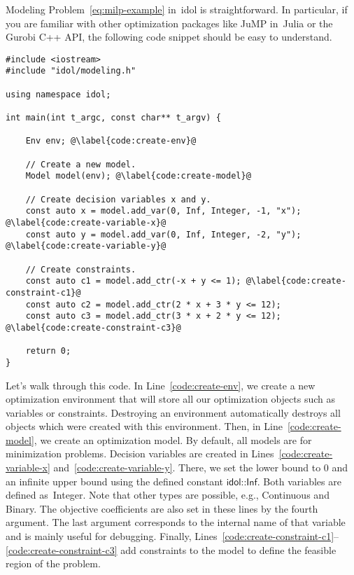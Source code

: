 Modeling Problem~\eqref{eq:milp-example} in~\textsf{idol} is straightforward.
In particular, if you are familiar with other optimization packages like
\textsf{JuMP} in~\textsf{Julia} or the \textsf{Gurobi} \textsf{C++} API,
the following code snippet should be easy to understand.
%
\begin{lstlisting}
#include <iostream>
#include "idol/modeling.h"

using namespace idol;

int main(int t_argc, const char** t_argv) {

    Env env; @\label{code:create-env}@

    // Create a new model.
    Model model(env); @\label{code:create-model}@

    // Create decision variables x and y.
    const auto x = model.add_var(0, Inf, Integer, -1, "x"); @\label{code:create-variable-x}@
    const auto y = model.add_var(0, Inf, Integer, -2, "y"); @\label{code:create-variable-y}@

    // Create constraints.
    const auto c1 = model.add_ctr(-x + y <= 1); @\label{code:create-constraint-c1}@
    const auto c2 = model.add_ctr(2 * x + 3 * y <= 12);
    const auto c3 = model.add_ctr(3 * x + 2 * y <= 12); @\label{code:create-constraint-c3}@

    return 0;
}

\end{lstlisting}

Let's walk through this code. In Line~\ref{code:create-env}, we create a new
optimization environment that will store all our optimization objects such as
variables or constraints. Destroying an environment automatically destroys all
objects which were created with this environment. Then, in
Line~\ref{code:create-model}, we create an optimization model. By default, all
models are for minimization problems. Decision variables are created in
Lines~\ref{code:create-variable-x} and~\ref{code:create-variable-y}. There, we
set the lower bound to 0 and an infinite upper bound using the defined
constant $\textsf{idol::Inf}$. Both variables are defined as~\textsf{Integer}.
Note that other types are possible, e.g., \textsf{Continuous} and
\textsf{Binary}. The objective coefficients are also set in these lines by the
fourth argument. The last argument corresponds to the internal name of that
variable and is mainly useful for debugging. Finally,
Lines~\ref{code:create-constraint-c1}--\ref{code:create-constraint-c3} add
constraints to the model to define the feasible region of the problem.

